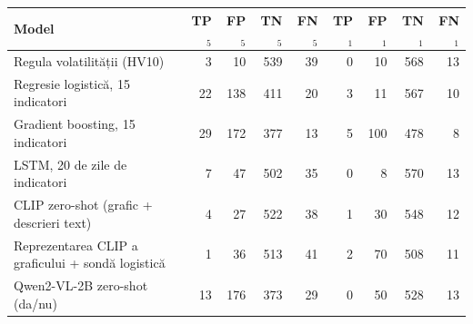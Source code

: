 \begin{tabular}{lrrrrrrrr}
\toprule
Model & TP$_{5}$ & FP$_{5}$ & TN$_{5}$ & FN$_{5}$ & TP$_{1}$ & FP$_{1}$ & TN$_{1}$ & FN$_{1}$ \\
\midrule
Regula volatilității (HV10) & 3 & 10 & 539 & 39 & 0 & 10 & 568 & 13 \\
Regresie logistică, 15 indicatori & 22 & 138 & 411 & 20 & 3 & 11 & 567 & 10 \\
Gradient boosting, 15 indicatori & 29 & 172 & 377 & 13 & 5 & 100 & 478 & 8 \\
LSTM, 20 de zile de indicatori & 7 & 47 & 502 & 35 & 0 & 8 & 570 & 13 \\
CLIP zero-shot (grafic + descrieri text) & 4 & 27 & 522 & 38 & 1 & 30 & 548 & 12 \\
Reprezentarea CLIP a graficului + sondă logistică & 1 & 36 & 513 & 41 & 2 & 70 & 508 & 11 \\
Qwen2-VL-2B zero-shot (da/nu) & 13 & 176 & 373 & 29 & 0 & 50 & 528 & 13 \\
\bottomrule
\end{tabular}
